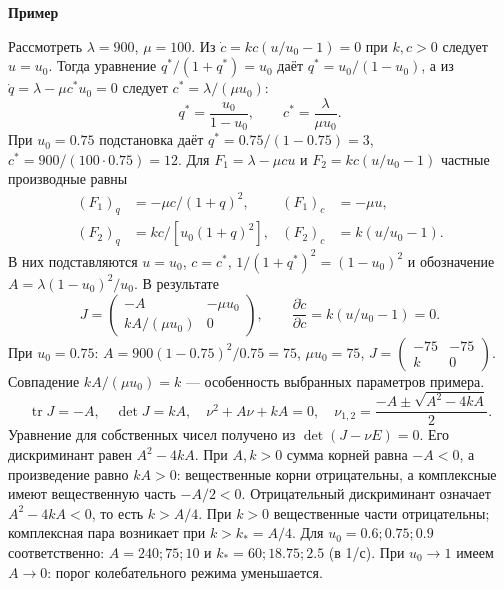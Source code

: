 \documentclass[12pt,a4paper]{article}
\newcommand{\taskhead}[1]{\par\textbf{#1}\par}
\begin{document}
\taskhead{Пример}
Рассмотреть $\lambda=900$, $\mu=100$.
Из $\dot c=kc(u/u_0-1)=0$ при $k,c>0$ следует $u=u_0$.
Тогда уравнение $q^*/(1+q^*)=u_0$ даёт $q^*=u_0/(1-u_0)$,
а из $\dot q=\lambda-\mu c^*u_0=0$ следует $c^*=\lambda/(\mu u_0)$:
\[
q^*=\frac{u_0}{1-u_0},\qquad c^*=\frac{\lambda}{\mu u_0}.
\]
При $u_0=0.75$ подстановка даёт
$q^*=0.75/(1-0.75)=3$, $c^*=900/(100\cdot0.75)=12$.
Для $F_1=\lambda-\mu cu$ и $F_2=kc(u/u_0-1)$ частные производные равны
\[
\begin{aligned}
(F_1)_q&=-\mu c/(1+q)^2,&(F_1)_c&=-\mu u,\\
(F_2)_q&=kc/[u_0(1+q)^2],&(F_2)_c&=k(u/u_0-1).
\end{aligned}
\]
В них подставляются $u=u_0$, $c=c^*$,
$1/(1+q^*)^2=(1-u_0)^2$ и обозначение $A=\lambda(1-u_0)^2/u_0$.
В результате
\[
J=\begin{pmatrix}-A&-\mu u_0\\kA/(\mu u_0)&0\end{pmatrix},\qquad
\frac{\partial\dot c}{\partial c}=k(u/u_0-1)=0.
\]
При $u_0=0.75$: $A=900(1-0.75)^2/0.75=75$, $\mu u_0=75$, $J=\begin{pmatrix}-75&-75\\k&0\end{pmatrix}$.
Совпадение $kA/(\mu u_0)=k$ --- особенность выбранных параметров примера.
\[
\operatorname{tr}J=-A,\quad \det J=kA,\quad
\nu^2+A\nu+kA=0,\quad \nu_{1,2}=\frac{-A\pm\sqrt{A^2-4kA}}2.
\]
Уравнение для собственных чисел получено из $\det(J-\nu E)=0$.
Его дискриминант равен $A^2-4kA$. При $A,k>0$ сумма корней равна $-A<0$,
а произведение равно $kA>0$: вещественные корни отрицательны,
а комплексные имеют вещественную часть $-A/2<0$.
Отрицательный дискриминант означает $A^2-4kA<0$, то есть $k>A/4$.
При $k>0$ вещественные части отрицательны; комплексная пара возникает
при $k>k_*=A/4$. Для $u_0=0.6;0.75;0.9$ соответственно:
$A=240;75;10$ и $k_*=60;18.75;2.5$ (в 1/с).
При $u_0\to1$ имеем $A\to0$: порог колебательного режима уменьшается.


\newpage
\end{document}
